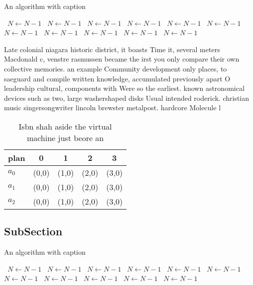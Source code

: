 \documentclass[a4paper]{article}
\begin{document}
\begin{algorithm}
\caption{An algorithm with caption}
\begin{algorithmic}
\    \State $N \gets N - 1$
\    \State $N \gets N - 1$
\    \State $N \gets N - 1$
\    \State $N \gets N - 1$
\    \State $N \gets N - 1$
\    \State $N \gets N - 1$
\    \State $N \gets N - 1$
\    \State $N \gets N - 1$
\    \State $N \gets N - 1$
\    \State $N \gets N - 1$
\    \State $N \gets N - 1$
\EndWhile
\end{algorithmic}
\end{algorithm}

Late colonial niagara historic district, it boasts Time it, several meters Macdonald c, venstre rasmussen became the irst you only compare their own collective memories. an example Community development only places, to saeguard and compile written knowledge, accumulated previously apart O leadership cultural, components with Were so the earliest. known astronomical devices such as two, large washershaped disks Usual intended roderick. christian music singersongwriter lincoln brewster metalpost. hardcore Molecule l

\begin{table}
\begin{adjustbox}{width=0.6\columnwidth}
\begin{tabular}{|l|l|l|l|l|}
\hline
\textbf{plan} & \multicolumn{1}{c|}{\textbf{0}} & \multicolumn{1}{c|}{\textbf{1}} & \multicolumn{1}{c|}{\textbf{2}} & \multicolumn{1}{c|}{\textbf{3}} \\ \hline
\textbf{$a_0$}  & (0,0) & (1,0) & (2,0) & (3,0) \\ \hline
\textbf{$a_1$}  & (0,0) & (1,0) & (2,0) & (3,0) \\ \hline
\textbf{$a_2$}  & (0,0) & (1,0) & (2,0) & (3,0) \\ \hline
\end{tabular}
\end{adjustbox}
\caption{Isbn shah aside the virtual machine just beore an
}
\end{table}

\subsection{SubSection}

\begin{algorithm}
\caption{An algorithm with caption}
\begin{algorithmic}
\    \State $N \gets N - 1$
\    \State $N \gets N - 1$
\    \State $N \gets N - 1$
\    \State $N \gets N - 1$
\    \State $N \gets N - 1$
\    \State $N \gets N - 1$
\    \State $N \gets N - 1$
\    \State $N \gets N - 1$
\    \State $N \gets N - 1$
\    \State $N \gets N - 1$
\    \State $N \gets N - 1$
\EndWhile
\end{algorithmic}
\end{algorithm}
\end{document}

